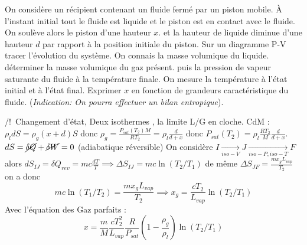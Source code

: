 \begin{Exercise}[title=]
	On considère un récipient contenant un fluide fermé par un piston mobile.
	À l'instant initial tout le fluide est liquide et le piston est en contact avec le fluide. On soulève alors le piston d'une hauteur $x$. et la hauteur de liquide diminue d'une hauteur $d$ par rapport à la position initiale du piston.
	\Question Sur un diagramme P-V tracer l'évolution du système.
	\Question On connais la masse volumique du liquide. déterminer la masse volumique du gaz présent. puis la pression de vapeur saturante du fluide à la température finale.
	\Question On mesure la température à l'état initial et à l'état final. Exprimer $x$ en fonction de grandeurs caractéristique du fluide. (\emph{Indication: On pourra effectuer un bilan entropique}).
\end{Exercise}
\begin{Answer}
	\Question /!\ Changement d'état, Deux isothermes , la limite L/G en cloche.
	\Question CdM :$\rho_l d S = \rho_g (x+d)S$ donc $ \rho_g = \frac{P_{sat}(T_2)M}{RT_2} = \rho_l\frac{d}{d+x}$ donc $P_{sat}(T_2) = \rho_l\frac{RT_2}{M}\frac{d}{d+x}$.
	\Question $dS =  \cancel{\delta Q} + \cancel{\delta W} = 0$  (adiabatique réversible)
	On considère $I\underset{iso-V}{\to} J \underset{iso-P,iso-T }{\to} F$
	alors
	$dS_{IJ} = \delta Q_{rev} = mc\frac{dT}{T} \implies \Delta S_{IJ} = mc\ln(T_2/T_1)$
	de même $\Delta S_{JF} = \frac{m x_g L_{vap}}{T_2}$
	on a donc
	\[
		mc\ln(T_1/T_2) = \frac{m x_g L_{vap}}{T_2} \implies x_g = \frac{cT_2}{L_{vap}}\ln(T_2/T_1)
	\]
	Avec l'équation des Gaz parfaits  :
	\[x = \frac{m}{M}\frac{cT_2^2}{L_{vap}}\frac{R}{P_{sat}}\left(1-\frac{\rho_g}{\rho_l}\right)\ln(T_2/T_1)\]
\end{Answer}
